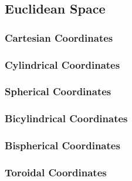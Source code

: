 \subsection{Euclidean Space}

\subsubsection*{Cartesian Coordinates}

\subsubsection*{Cylindrical Coordinates}

\subsubsection*{Spherical Coordinates}

\subsubsection*{Bicylindrical Coordinates}

\subsubsection*{Bispherical Coordinates}

\subsubsection*{Toroidal Coordinates}